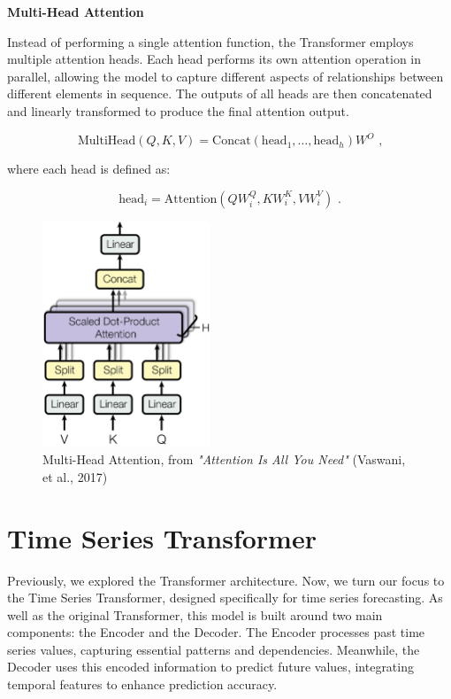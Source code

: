 \noindent\textbf{Multi-Head Attention}

\noindent Instead of performing a single attention function, the Transformer employs multiple attention heads. Each head performs its own attention operation in parallel, allowing the model to capture different aspects of relationships between different elements in sequence. The outputs of all heads are then concatenated and linearly transformed to produce the final attention output.

\begin{equation}
\text{MultiHead}(Q,K,V) = \text{Concat}(\text{head}_1, \ldots, \text{head}_h) W^O \text{ ,}
\end{equation}

\noindent where each head is defined as:

\begin{equation}
\text{head}_i = \text{Attention}(QW_i^Q, KW_i^K, VW_i^V) \text{ .}
\end{equation}

\begin{figure}[htbp]
    \centering
    \includegraphics[width=5cm]{3_ChapterTranformerVariants/figuras/MultiHeadAttention.png}
    \caption{Multi-Head Attention, from \textit{"Attention Is All You Need"} (Vaswani, et al., 2017) \cite{vaswani2023attention}}
    \end{figure}

\section{Time Series Transformer}

Previously, we explored the Transformer architecture. Now, we turn our focus to the Time Series Transformer, designed specifically for time series forecasting. As well as the original Transformer, this model is built around two main components: the Encoder and the Decoder. The Encoder processes past time series values, capturing essential patterns and dependencies. Meanwhile, the Decoder uses this encoded information to predict future values, integrating temporal features to enhance prediction accuracy.

